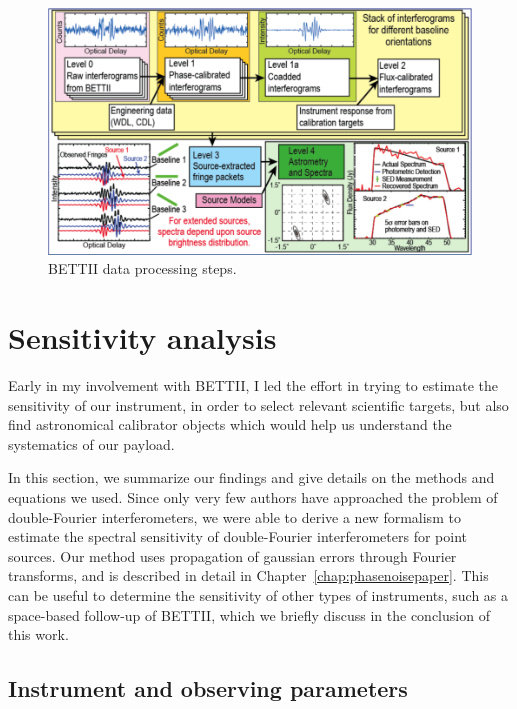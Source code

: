 \begin{figure}[!h]
	\centering
	\includegraphics[width=\textwidth]{Figures/DataProcessing.png}
	\caption[Data processing]{BETTII data processing steps.}
	\label{fig:dataProcessing}
    \end{figure}



\newpage
\section{Sensitivity analysis}

Early in my involvement with BETTII, I led the effort in trying to estimate the sensitivity of our instrument, in order to select relevant scientific targets, but also find astronomical calibrator objects which would help us understand the systematics of our payload.

In this section, we summarize our findings and give details on the methods and equations we used. Since only very few authors have approached the problem of double-Fourier interferometers, we were able to derive a new formalism to estimate the spectral sensitivity of double-Fourier interferometers for point sources. Our method uses propagation of gaussian errors through Fourier transforms, and is described in detail in Chapter~\ref{chap:phasenoisepaper}. This can be useful to determine the sensitivity of other types of instruments, such as a space-based follow-up of BETTII, which we briefly discuss in the conclusion of this work.

\subsection{Instrument and observing parameters}

